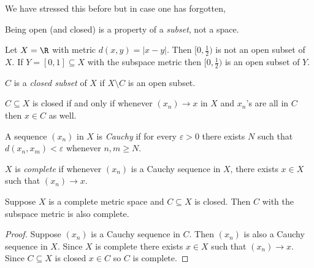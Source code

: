 \documentclass[a4paper]{article}
\theoremstyle{definition}
\begin{document}
We have stressed this before but in case one has forgotten,

\begin{note}
  Being open (and closed) is a property of a \emph{subset}, not a space.
\end{note}

\begin{eg}
  Let \(X = \R\) with metric \(d(x, y) = |x - y|\). Then \([0, \frac{1}{2})\) is not an open subset of \(X\). If \(Y = [0, 1] \subseteq X\) with the subspace metric then \([0, \frac{1}{2})\) is an open subset of \(Y\).
\end{eg}

\begin{definition}
  \(C\) is a \emph{closed subset} of \(X\) if \(X \setminus C\) is an open subset.
\end{definition}

\begin{proposition}
  \(C \subseteq X\) is closed if and only if whenever \((x_n) \to x\) in \(X\) and \(x_n\)'s are all in \(C\) then \(x \in C\) as well.
\end{proposition}

\begin{definition}
  A sequence \((x_n)\) in \(X\) is \emph{Cauchy} if for every \(\varepsilon > 0\) there exists \(N\) such that \(d(x_n, x_m) < \varepsilon\) whenever \(n, m \geq N\).
\end{definition}

\begin{definition}[Completeness]
  \(X\) is \emph{complete} if whenever \((x_n)\) is a Cauchy sequence in \(X\), there exists \(x \in X\) such that \((x_n) \to x\).
\end{definition}

\begin{proposition}
  Suppose \(X\) is a complete metric space and \(C \subseteq X\) is closed. Then \(C\) with the subspace metric is also complete.
\end{proposition}

\begin{proof}
  Suppose \((x_n)\) is a Cauchy sequence in \(C\). Then \((x_n)\) is also a Cauchy sequence in \(X\). Since \(X\) is complete there exists \(x \in X\) such that \((x_n) \to x\). Since \(C \subseteq X\) is closed \(x \in C\) so \(C\) is complete.
\end{proof}
\end{document}
